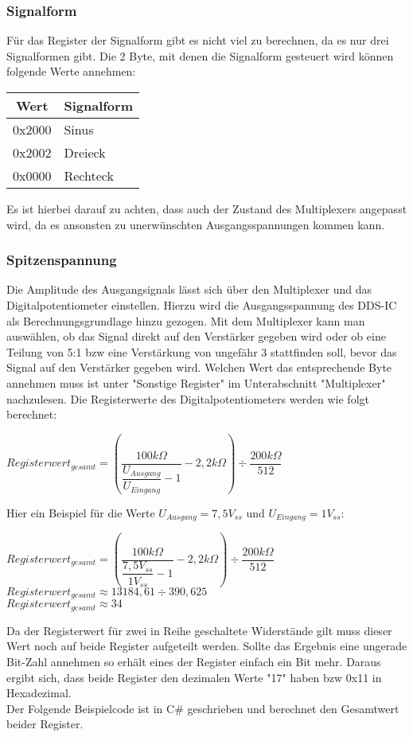 \subsubsection{Signalform}
Für das Register der Signalform gibt es nicht viel zu berechnen, da es nur drei Signalformen gibt. Die 2 Byte, mit denen die Signalform gesteuert wird können folgende Werte annehmen:
\begin{center}
\begin{tabular}{c||l}
Wert & Signalform \\
\hline
\hline
0x2000 & Sinus \\
\hline
0x2002 & Dreieck \\
\hline
0x0000 & Rechteck \\
\end{tabular}
\end{center}
Es ist hierbei darauf zu achten, dass auch der Zustand des Multiplexers angepasst wird, da es ansonsten zu unerwünschten Ausgangsspannungen kommen kann.

\subsubsection{Spitzenspannung}
Die Amplitude des Ausgangsignals lässt sich über den Multiplexer und das Digitalpotentiometer einstellen. Hierzu wird die Ausgangsspannung des DDS-IC als Berechnungsgrundlage hinzu gezogen. Mit dem Multiplexer kann man auswählen, ob das Signal direkt auf den Verstärker gegeben wird oder ob eine Teilung von 5:1 bzw eine Verstärkung von ungefähr 3 stattfinden soll, bevor das Signal auf den Verstärker gegeben wird. Welchen Wert das entsprechende Byte annehmen muss ist unter "Sonstige Register" im Unterabschnitt "Multiplexer" nachzulesen. Die Registerwerte des Digitalpotentiometers werden wie folgt berechnet:\\

\begin{center}
$Registerwert_{gesamt} = (\dfrac{100k\Omega}{\dfrac{U_{Ausgang}}{U_{Eingang}}-1}-2,2k\Omega)\div \dfrac{200k\Omega}{512}$
\end{center}

Hier ein Beispiel für die Werte $U_{Ausgang}=7,5V_{ss}$ und $U_{Eingang}=1V_{ss}$:\\

\begin{center}
$Registerwert_{gesamt} = (\dfrac{100k\Omega}{\dfrac{7,5V_{ss}}{1V_{ss}}-1}-2,2k\Omega)\div \dfrac{200k\Omega}{512}$\\
\medskip
$Registerwert_{gesamt} \approx 13184,61\div 390,625$ \\
\medskip
$Registerwert_{gesamt} \approx 34$
\end{center}
Da der Registerwert für zwei in Reihe geschaltete Widerstände gilt muss dieser Wert noch auf beide Register aufgeteilt werden. Sollte das Ergebnis eine ungerade Bit-Zahl annehmen so erhält eines der Register einfach ein Bit mehr. Daraus ergibt sich, dass beide Register den dezimalen Werte "17" haben bzw 0x11 in Hexadezimal.\\
Der Folgende Beispielcode ist in C\# geschrieben und berechnet den Gesamtwert beider Register.

